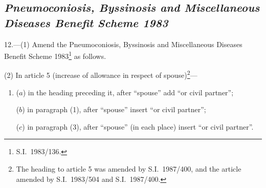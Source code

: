 \documentclass[12pt,a4paper]{article}
\begin{document}
\subsection*{\itshape\sloppy Pneumoconiosis, Byssinosis and Miscellaneous Diseases Benefit Scheme 1983}

12.---(1)  Amend the Pneumoconiosis, Byssinosis and Miscellaneous Diseases Benefit Scheme 1983\footnote{S.I.\ 1983/136.} as follows.

(2) In article 5 (increase of allowance in respect of spouse)\footnote{The heading to article 5 was amended by S.I.\ 1987/400, and the article amended by S.I.\ 1983/504 and S.I.\ 1987/400.}—
\begin{enumerate}\item[]
($a$) in the heading preceding it, after “spouse” add “or civil partner”;

($b$) in paragraph (1), after “spouse” insert “or civil partner”;

($c$) in paragraph (3), after “spouse” (in each place) insert “or civil partner”.
\end{enumerate}
\end{document}

